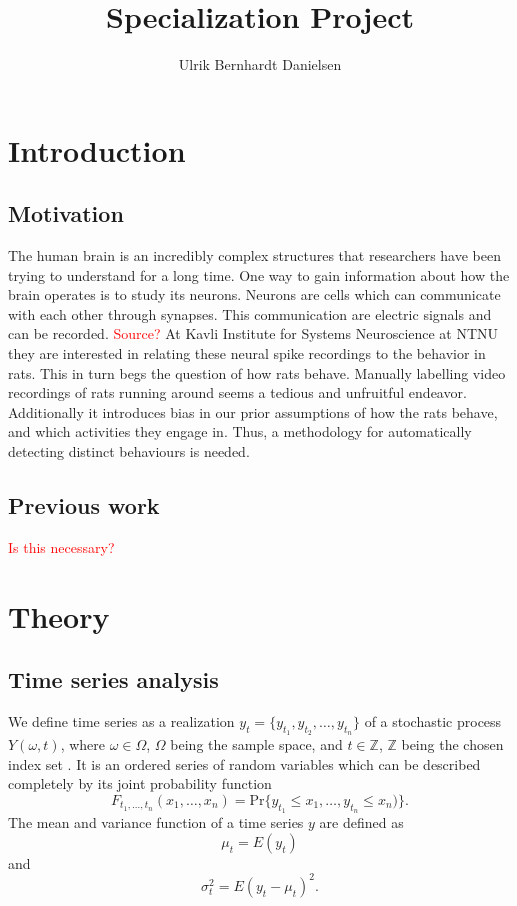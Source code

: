 \documentclass[a4paper]{memoir}
\title{Specialization Project}
\author{Ulrik Bernhardt Danielsen}
\theoremstyle{plain}
\theoremstyle{definition}
\theoremstyle{remark}
\begin{document}
\maketitle

\tableofcontents*
\clearpage



\chapter{Introduction}
\section{Motivation}
The human brain is an incredibly complex structures that researchers have been trying to understand for a long time.
One way to gain information about how the brain operates is to study its neurons.
Neurons are cells which can communicate with each other through synapses.
This communication are electric signals and can be recorded.
\textcolor{red}{Source?}
At Kavli Institute for Systems Neuroscience at NTNU they are interested in relating these neural spike recordings to the behavior in rats.
This in turn begs the question of how rats behave.
Manually labelling video recordings of rats running around seems a tedious and unfruitful endeavor.
Additionally it introduces bias in our prior assumptions of how the rats behave, and which activities they engage in.
Thus, a methodology for automatically detecting distinct behaviours is needed.

\section{Previous work}
\textcolor{red}{Is this necessary?}



\chapter{Theory}
\section{Time series analysis}
We define time series as a realization $y_t = \{ y_{t_1}, y_{t_2}, \hdots, y_{t_n} \}$ of a stochastic process $Y(\omega, t)$, where $\omega \in \Omega$, $\Omega$ being the sample space,  and $t \in \mathbb{Z}$, $\mathbb{Z}$ being the chosen index set  \cite{wei}.
It is an ordered series of random variables which can be described completely by its joint probability function
\begin{equation*}
        F_{t_1,\hdots, t_n}(x_1, \hdots, x_n) = \text{Pr}\{ y_{t_1} \leq x_{1}, \hdots, y_{t_n} \leq x_n) \}.
\end{equation*}
The mean and variance function of a time series $y$ are defined as
\begin{equation}\label{eq:mean_func}
        \mu_t = E(y_t)  
\end{equation}
and
\begin{equation*}
        \sigma_t^2 = E(y_t - \mu_t)^2.
\end{equation*}
\end{document}
